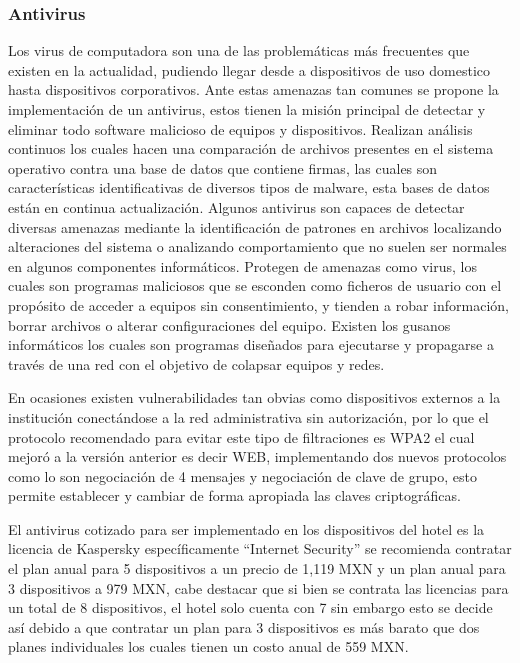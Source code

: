 \documentclass[10pt]{article}
\begin{document}
\subsubsection{Antivirus}

Los virus de computadora son una de las problemáticas más frecuentes que existen en la actualidad, pudiendo llegar desde a dispositivos de uso domestico hasta dispositivos corporativos. Ante estas amenazas tan comunes se propone la implementación de un antivirus, estos tienen la misión principal de detectar y eliminar todo software malicioso de equipos y dispositivos. Realizan análisis continuos los cuales hacen una comparación de archivos presentes en el sistema operativo contra una base de datos que contiene firmas, las cuales son características identificativas de diversos tipos de malware, esta bases de datos están en continua actualización. Algunos antivirus son capaces de detectar diversas amenazas mediante la identificación de patrones en archivos localizando alteraciones del sistema o analizando comportamiento que no suelen ser normales en algunos componentes informáticos. Protegen de amenazas como virus, los cuales son programas maliciosos que se esconden como ficheros de usuario con el propósito de acceder a equipos sin consentimiento, y tienden a robar información, borrar archivos o alterar configuraciones del equipo.
Existen los gusanos informáticos los cuales son programas diseñados para ejecutarse y propagarse a través de una red con el objetivo de colapsar equipos y redes. \cite{ref4}

En ocasiones existen vulnerabilidades tan obvias como dispositivos externos a la institución conectándose a la red administrativa sin autorización, por lo que el protocolo recomendado para evitar este tipo de filtraciones es WPA2 el cual mejoró a la versión anterior es decir WEB, implementando dos nuevos protocolos como lo son negociación de 4 mensajes y negociación de clave de grupo, esto permite establecer y cambiar de forma apropiada las claves criptográficas. \cite{ref3}

El antivirus cotizado para ser implementado en los dispositivos del hotel es la licencia de Kaspersky específicamente ``Internet Security'' se recomienda contratar el plan anual para 5 dispositivos a un precio de 1,119 MXN y un plan anual para 3 dispositivos a 979 MXN, cabe destacar que si bien se contrata las licencias para un total de 8 dispositivos, el hotel solo cuenta con 7 sin embargo esto se decide así debido a que contratar un plan para 3 dispositivos es más barato que dos planes individuales los cuales tienen un costo anual de 559 MXN. \cite{ref13}
\end{document}
